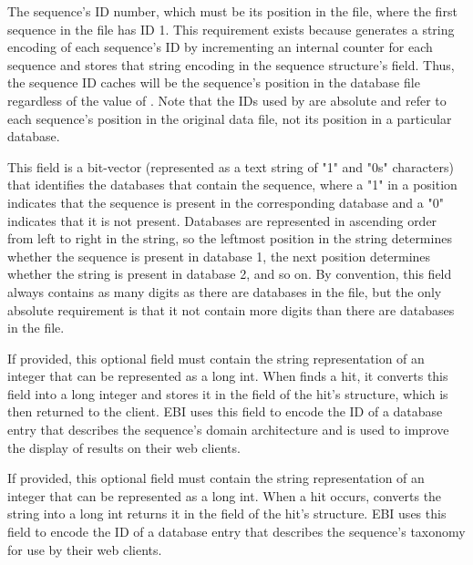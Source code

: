 \documentclass[notoc,justified]{tufte-book}    %
\begin{document}
\begin{sreitems}{}

\item [\monob{seq\_id}] The sequence's ID number, which must be its position in the file, where the first sequence in the file has ID 1. This requirement exists because  generates a string encoding of each sequence's ID by incrementing an internal counter for each sequence and stores that string encoding in the sequence structure's  field.  Thus, the sequence ID  caches will be the sequence's position in the database file regardless of the value of .  Note that the IDs used by  are absolute and refer to each sequence's position in the original data file, not its position in a particular database.

\item [\monob{database\_membership}] This field is a bit-vector (represented as a text string of "1" and "0s" characters) that identifies the databases that contain the sequence, where a "1" in a position indicates that the sequence is present in the corresponding database and a "0" indicates that it is not present.  Databases are represented in ascending order from left to right in the string, so the leftmost position in the string determines whether the sequence is present in database 1, the next position determines whether the string is present in database 2, and so on.  By convention, this field always contains as many digits as there are databases in the file, but the only absolute requirement is that it not contain more digits than there are databases in the file.

\item [\monob{domain\_architecture}] If provided, this optional field must contain the string representation of an integer that can be represented as a long int.  When  finds a hit, it converts this field into a long integer and stores it in the  field of the hit's  structure, which is then returned to the client.  EBI uses this field to encode the ID of a database entry that describes the sequence's domain architecture and is used to improve the display of results on their web clients.   

\item [\monob{taxonomy\_id}] If provided, this optional field must contain the string representation of an integer that can be represented as a long int.  When a hit occurs,  converts the string into a long int returns it in the  field of the hit's  structure.  EBI uses this field to encode the ID of a database entry that describes the sequence's taxonomy for use by their web clients.

\end{sreitems}
\end{document}
